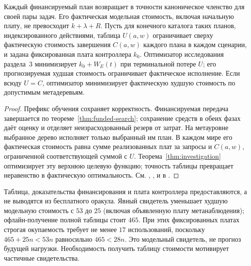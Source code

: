 \begin{theorem}\label{thm:meta-selection}
Каждый финансируемый план возвращает в точности каноническое членство для своей пары задач. Его фактическая модельная стоимость, включая начальную плату, не превосходит $k+\lambda+R$. Пусть для конечного каталога таких планов, индексированного действиями, таблица $U(a,w)$ ограничивает сверху фактическую стоимость завершения $C(a,w)$ каждого плана в каждом сценарии, и задана фиксированная плата контроллера $k_0$. Оптимизатор исследования раздела~3 минимизирует $k_0+W_E(t)$ при терминальной потере $U$; его прогнозируемая худшая стоимость ограничивает фактическое исполнение. Если всюду $U=C$, оптимизатор минимизирует фактическую худшую стоимость по допустимым метадеревьям.
\end{theorem}
\begin{proof}
Префикс обучения сохраняет корректность. Финансируемая передача завершается по теореме~\ref{thm:funded-search}; сохранение средств в обеих фазах даёт оценку и отделяет неизрасходованный резерв от затрат. На метауровне выбранное дерево исполняет только выбранный им план. В каждом мире его фактическая стоимость равна сумме реализованных плат за запросы и $C(a,w)$, ограниченной соответствующей суммой с $U$. Теорема~\ref{thm:investigation} оптимизирует эту верхнюю целевую функцию; точность таблицы превращает неравенство в фактическую оптимальность. См. , ,  и  в .
\end{proof}
Таблица, доказательства финансирования и плата контроллера предоставляются, а не выводятся из бесплатного оракула. Явный свидетель уменьшает худшую модельную стоимость с $53$ до $25$ (включая объявленную плату метанаблюдения); офлайн-получение полной таблицы стоит $465$. При этих фиксированных платах строгая окупаемость требует не менее $17$ использований, поскольку $465+25n<53n$ равносильно $465<28n$. Это модельный свидетель, не прогноз будущей нагрузки. Необходимость получить таблицу стоимости мотивирует частичные свидетельства.

